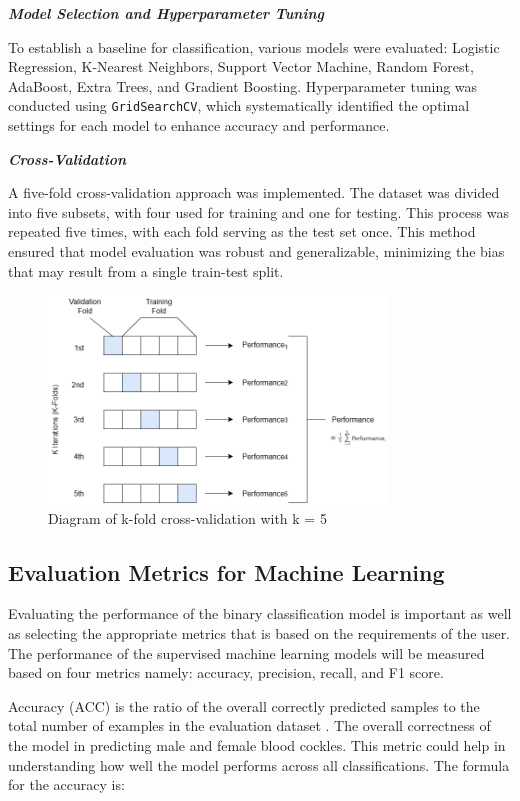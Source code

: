 \textbf{\textit{Model Selection and Hyperparameter Tuning}}

To establish a baseline for classification, various models were evaluated: Logistic Regression, K-Nearest Neighbors, Support Vector Machine, Random Forest, AdaBoost, Extra Trees, and Gradient Boosting. Hyperparameter tuning was conducted using \texttt{GridSearchCV}, which systematically identified the optimal settings for each model to enhance accuracy and performance.

\textbf{\textit{Cross-Validation}}

A five-fold cross-validation approach was implemented. The dataset was divided into five subsets, with four used for training and one for testing. This process was repeated five times, with each fold serving as the test set once. This method ensured that model evaluation was robust and generalizable, minimizing the bias that may result from a single train-test split. \cite{geeksforgeeks2024}

\begin{figure}[!htbp]
	\centering
	\includegraphics[width=0.8\textwidth]{figures/cv.png}
	\caption{Diagram of k-fold cross-validation with k = 5}
	\label{fig: cv}
\end{figure}

\subsection{Evaluation Metrics for Machine Learning}
Evaluating the performance of the binary classification model is important as well as selecting the appropriate metrics that is based on the requirements of the user. The performance of the supervised machine learning models will be measured based on four metrics namely: accuracy, precision, recall, and F1 score. 

Accuracy (ACC) is the ratio of the overall correctly predicted samples to the total number of examples in the evaluation dataset \cite{cui2020}. The overall correctness of the model in predicting male and female blood cockles. This metric could help in understanding how well the model performs across all classifications. The formula for the accuracy is: 

